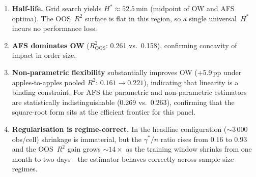 \documentclass[11pt,a4paper]{article}
\begin{document}
\begin{enumerate}[leftmargin=2em]
  \item \textbf{Half-life.}  Grid search yields $H^*\!\approx\!52.5$\,min
        (midpoint of OW and AFS optima).  The OOS~$R^2$ surface is flat
        in this region, so a single universal~$H^*$ incurs no
        performance loss.

  \item \textbf{AFS dominates OW} ($R^2_\text{OOS}$: 0.261 vs.\ 0.158),
        confirming concavity of impact in order size.

  \item \textbf{Non-parametric flexibility} substantially improves OW
        (+5.9\,pp under apples-to-apples pooled $R^2$:
        $0.161\!\to\!0.221$), indicating that linearity is a binding
        constraint.  For AFS the parametric and non-parametric
        estimators are statistically indistinguishable
        ($0.269$ vs.\ $0.263$), confirming that the square-root form
        sits at the efficient frontier for this panel.

  \item \textbf{Regularisation is regime-correct.}  In the headline
        configuration ($\sim\!3\,000$ obs/cell) shrinkage is
        immaterial, but the $\gamma^*/n$ ratio rises from $0.16$ to
        $0.93$ and the OOS~$R^2$ gain grows ${\sim}14\times$ as the
        training window shrinks from one month to two days---the
        estimator behaves correctly across sample-size regimes.
\end{enumerate}
\end{document}
